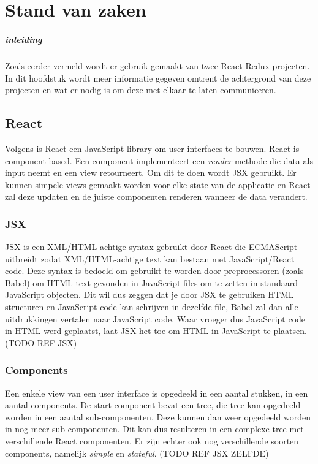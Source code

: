 \chapter{Stand van zaken}
\label{ch:stand-van-zaken}


\paragraph{inleiding}
Zoals eerder vermeld wordt er gebruik gemaakt van twee React-Redux projecten. In dit hoofdstuk wordt meer informatie gegeven omtrent de achtergrond van deze projecten en wat er nodig is om deze met elkaar te laten communiceren.

\section{React}
Volgens \autocite{React01} is React een JavaScript library om user interfaces te bouwen. React is component-based. Een component implementeert een \textit{render} methode die data als input neemt en een view retourneert. Om dit te doen wordt JSX gebruikt. Er kunnen simpele views gemaakt worden voor elke state van de applicatie en React zal deze updaten en de juiste componenten renderen wanneer de data verandert.

\subsection{JSX}
JSX is een XML/HTML-achtige syntax gebruikt door React die ECMAScript uitbreidt zodat XML/HTML-achtige text kan bestaan met JavaScript/React code. Deze syntax is bedoeld om gebruikt te worden door preprocessoren (zoals Babel) om HTML text gevonden in JavaScript files om te zetten in standaard JavaScript objecten. Dit wil dus zeggen dat je door JSX te gebruiken HTML structuren en JavaScript code kan schrijven in dezelfde file, Babel zal dan alle uitdrukkingen vertalen naar JavaScript code. Waar vroeger dus JavaScript code in HTML werd geplaatst, laat JSX het toe om HTML in JavaScript te plaatsen.
(TODO REF JSX)

\subsection{Components}
Een enkele view van een user interface is opgedeeld in een aantal stukken, in een aantal components. De start component bevat een tree, die tree kan opgedeeld worden in een aantal sub-componenten. Deze kunnen dan weer opgedeeld worden in nog meer sub-componenten. Dit kan dus resulteren in een complexe tree met verschillende React componenten. Er zijn echter ook nog verschillende soorten components, namelijk \textit{simple} en \textit{stateful}. 
(TODO REF JSX ZELFDE)

